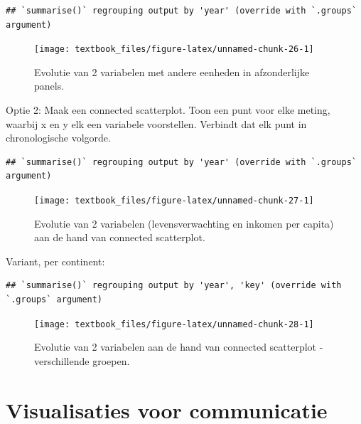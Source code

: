 \documentclass[]{tufte-book}
\begin{document}
\begin{verbatim}
## `summarise()` regrouping output by 'year' (override with `.groups` argument)
\end{verbatim}

\begin{figure}
\texttt{[image: textbook\_files/figure-latex/unnamed-chunk-26-1]} \caption[Evolutie van 2 variabelen met andere eenheden in afzonderlijke panels]{Evolutie van 2 variabelen met andere eenheden in afzonderlijke panels.}\label{fig:unnamed-chunk-26}
\end{figure}

Optie 2: Maak een connected scatterplot. Toon een punt voor elke meting, waarbij x en y elk een variabele voorstellen. Verbindt dat elk punt in chronologische volgorde.

\begin{verbatim}
## `summarise()` regrouping output by 'year' (override with `.groups` argument)
\end{verbatim}

\begin{figure}
\texttt{[image: textbook\_files/figure-latex/unnamed-chunk-27-1]} \caption[Evolutie van 2 variabelen (levensverwachting en inkomen per capita) aan de hand van connected scatterplot]{Evolutie van 2 variabelen (levensverwachting en inkomen per capita) aan de hand van connected scatterplot.}\label{fig:unnamed-chunk-27}
\end{figure}

Variant, per continent:

\begin{verbatim}
## `summarise()` regrouping output by 'year', 'key' (override with `.groups` argument)
\end{verbatim}

\begin{figure}
\texttt{[image: textbook\_files/figure-latex/unnamed-chunk-28-1]} \caption[Evolutie van 2 variabelen aan de hand van connected scatterplot - verschillende groepen]{Evolutie van 2 variabelen aan de hand van connected scatterplot - verschillende groepen.}\label{fig:unnamed-chunk-28}
\end{figure}

\hypertarget{visualisaties-voor-communicatie}{%
\section{Visualisaties voor communicatie}\label{visualisaties-voor-communicatie}}
\end{document}
